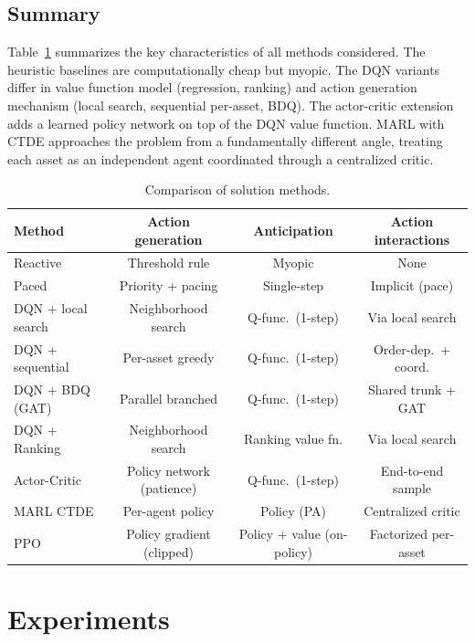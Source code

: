 \documentclass[3p, twocolumn]{elsarticle}
\begin{document}
\subsection{Summary}
\label{subsec:method_summary}

Table~\ref{tab:method_comparison} summarizes the key characteristics of all methods considered. The heuristic baselines are computationally cheap but myopic. The DQN variants differ in value function model (regression, ranking) and action generation mechanism (local search, sequential per-asset, BDQ). The actor-critic extension adds a learned policy network on top of the DQN value function. MARL with CTDE approaches the problem from a fundamentally different angle, treating each asset as an independent agent coordinated through a centralized critic.

\begin{table}[htpb]
\centering
\caption{Comparison of solution methods.}
\label{tab:method_comparison}
\small
\begin{tabular}{lccc}
\hline
\textbf{Method} & \textbf{Action generation} & \textbf{Anticipation} & \textbf{Action interactions} \\
\hline
Reactive           & Threshold rule            & Myopic         & None \\
Paced              & Priority + pacing         & Single-step    & Implicit (pace) \\
DQN + local search & Neighborhood search       & Q-func.\ (1-step) & Via local search \\
DQN + sequential   & Per-asset greedy          & Q-func.\ (1-step) & Order-dep.\ + coord. \\
DQN + BDQ (GAT)    & Parallel branched         & Q-func.\ (1-step) & Shared trunk + GAT \\
DQN + Ranking      & Neighborhood search       & Ranking value fn. & Via local search \\
Actor-Critic       & Policy network (patience) & Q-func.\ (1-step) & End-to-end sample \\
MARL CTDE          & Per-agent policy          & Policy (PA)    & Centralized critic \\
PPO                & Policy gradient (clipped)  & Policy + value (on-policy) & Factorized per-asset \\
\hline
\end{tabular}
\end{table}

\section{Experiments}
\label{sec:experiments}
\end{document}
